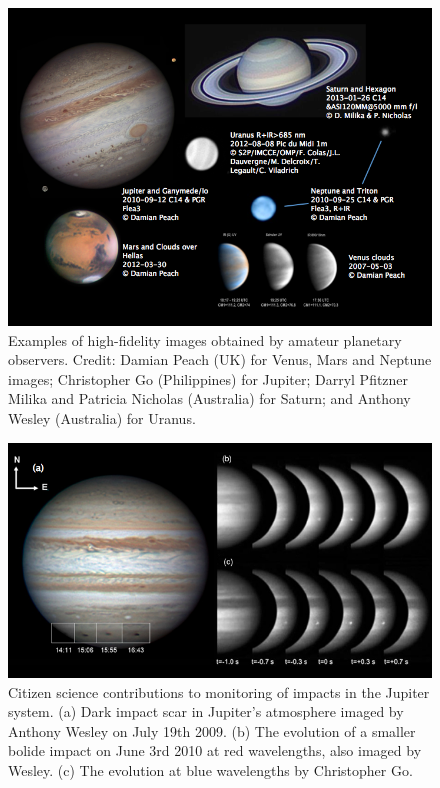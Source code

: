 \documentclass{ar2e}
\begin{document}

\jvol{}
\ARinfo{}




\begin{figure}[!ht]
\centering\includegraphics[width=\linewidth]{figs/planets.png}
\caption{Examples of high-fidelity images obtained by amateur planetary
observers.  Credit:  Damian Peach (UK) for Venus, Mars and Neptune images;
Christopher Go (Philippines) for Jupiter; Darryl Pfitzner Milika and Patricia
Nicholas (Australia) for Saturn; and Anthony Wesley (Australia) for Uranus.}
\label{fig:planets}
\end{figure}


\begin{figure}[!ht]
\centering\includegraphics[width=\linewidth]{figs/jupiter-impacts.png}
\caption{Citizen science contributions to monitoring of impacts in the Jupiter
system. (a) Dark impact scar in Jupiter's atmosphere imaged by Anthony
Wesley on July 19th 2009. (b) The
evolution of a smaller bolide impact on June 3rd 2010 at red
wavelengths, also imaged by Wesley. (c) The evolution at blue
wavelengths by Christopher Go.}
\label{fig:jupiter-impacts}
\end{figure}
\end{document}
